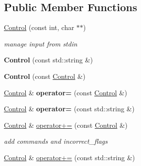 \subsection*{Public Member Functions}
\begin{DoxyCompactItemize}
\item 
\mbox{\label{class_control_a3201b6907d22e4034c0eceaf38d78449}} 
\mbox{\hyperlink{class_control_a3201b6907d22e4034c0eceaf38d78449}{Control}} (const int, char $\ast$$\ast$)
\begin{DoxyCompactList}\small\item\em manage input from stdin \end{DoxyCompactList}\item 
\mbox{\label{class_control_a8cc17820380c76b49979134fb2bb0280}} 
{\bfseries Control} (const std\+::string \&)
\item 
\mbox{\label{class_control_a2c2cb5a17c8a125350c543097b188f67}} 
{\bfseries Control} (const \mbox{\hyperlink{class_control}{Control}} \&)
\item 
\mbox{\label{class_control_a84586bbffaee27751ae8a4004c1f3a5e}} 
\mbox{\hyperlink{class_control}{Control}} \& {\bfseries operator=} (const \mbox{\hyperlink{class_control}{Control}} \&)
\item 
\mbox{\label{class_control_af158514e9f3c5bdd6a31ec409d48dc3b}} 
\mbox{\hyperlink{class_control}{Control}} \& {\bfseries operator=} (const std\+::string \&)
\item 
\mbox{\label{class_control_a65c77a675ccc4a39476354cf1222419a}} 
\mbox{\hyperlink{class_control}{Control}} \& \mbox{\hyperlink{class_control_a65c77a675ccc4a39476354cf1222419a}{operator+=}} (const \mbox{\hyperlink{class_control}{Control}} \&)
\begin{DoxyCompactList}\small\item\em add commands and incorrect\+\_\+flags \end{DoxyCompactList}\item 
\mbox{\label{class_control_aacf7ffe575257d1fb7a8183e53881fb8}} 
\mbox{\hyperlink{class_control}{Control}} \& \mbox{\hyperlink{class_control_aacf7ffe575257d1fb7a8183e53881fb8}{operator+=}} (const std\+::string \&)
$$
\end{DoxyCompactItemize}
